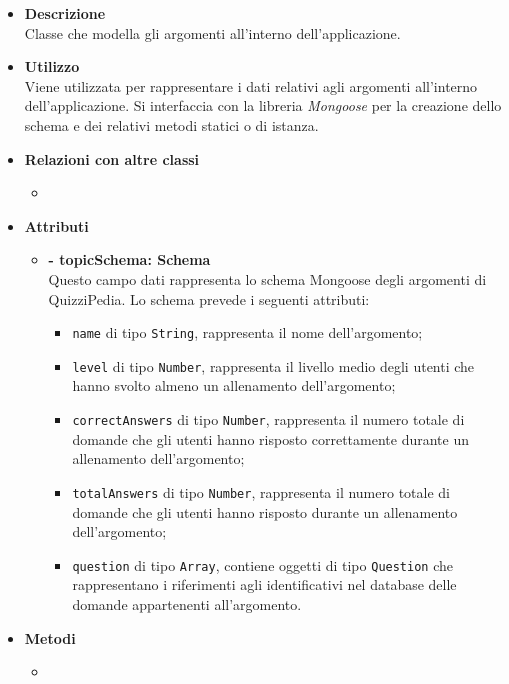 \begin{itemize}
	\item \textbf{Descrizione} \\
	Classe che modella gli argomenti all'interno dell'applicazione.
	\item \textbf{Utilizzo} \\
	Viene utilizzata per rappresentare i dati relativi agli argomenti all'interno dell'applicazione. Si interfaccia con la libreria \textit{Mongoose} per la creazione dello schema e dei relativi metodi statici o di istanza.
	\item \textbf{Relazioni con altre classi}
		\begin{itemize}
			\item 
		\end{itemize}
	\item \textbf{Attributi}
		\begin{itemize}
			\item \textbf{- topicSchema: Schema} \\
			Questo campo dati rappresenta lo schema Mongoose degli argomenti di QuizziPedia. Lo schema prevede i seguenti attributi:
				\begin{itemize}
					\item \texttt{name} di tipo \texttt{String}, rappresenta il nome dell'argomento;
					\item \texttt{level} di tipo \texttt{Number}, rappresenta il livello medio degli utenti che hanno svolto almeno un allenamento dell'argomento;
					\item \texttt{correctAnswers} di tipo \texttt{Number}, rappresenta il numero totale di domande che gli utenti hanno risposto correttamente durante un allenamento dell'argomento; 
					\item \texttt{totalAnswers} di tipo \texttt{Number}, rappresenta il numero totale di domande che gli utenti hanno risposto durante un allenamento dell'argomento;
					\item \texttt{question} di tipo \texttt{Array}, contiene oggetti di tipo \texttt{Question} che rappresentano i riferimenti agli identificativi nel database delle domande appartenenti all'argomento.
				\end{itemize}
		\end{itemize}
	\item \textbf{Metodi}
		\begin{itemize}
			\item 
		\end{itemize}
\end{itemize}